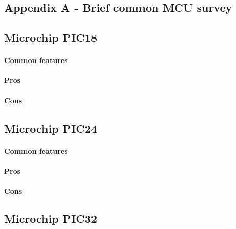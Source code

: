 \documentclass[a4paper,10pt]{article}
\begin{document}
\begin{multicols}{2}
\section{Appendix A - Brief common MCU survey}

\TODO


\subsection{Microchip PIC18}

\TODO


\paragraph{Common features}
\TODO


\paragraph{Pros}
\TODO


\paragraph{Cons}
\TODO


\subsection{Microchip PIC24}

\TODO


\paragraph{Common features}
\TODO


\paragraph{Pros}
\TODO


\paragraph{Cons}
\TODO


\subsection{Microchip PIC32}


\end{multicols}
\end{document}
